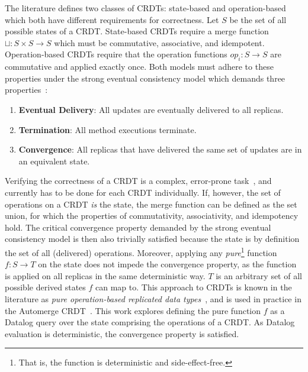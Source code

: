 The literature defines two classes of \acp{CRDT}: state-based and operation-based
which both have different requirements for correctness.
Let \( S \) be the set of all possible states of a \ac{CRDT}.
State-based \acp{CRDT} require a merge function \( \sqcup: S \times S \to S \)
which must be commutative, associative, and idempotent.
Operation-based \acp{CRDT} require that the operation functions \( op_i: S \to S \)
are commutative and applied exactly once.
Both models must adhere to these properties under the strong eventual consistency
model which demands three properties~\cite{shapiro2011comprehensive}:

\begin{enumerate}
	\item \textbf{Eventual Delivery}: All updates are eventually delivered to
	      all replicas.
	\item \textbf{Termination}: All method executions terminate.
	\item \textbf{Convergence}: All replicas that have delivered the same set of
	      updates are in an equivalent state.
\end{enumerate}

Verifying the correctness of a \ac{CRDT} is a complex,
error-prone task~\cite{gomes2017verifying, kleppmann2022assessing},
and currently has to be done for each \ac{CRDT} individually.
If, however, the set of operations on a \ac{CRDT} \emph{is} the state,
the merge function can be defined as the set union,
for which the properties of commutativity, associativity, and idempotency hold.
The critical convergence property demanded by the strong eventual consistency
model is then also trivially satisfied because the state is by definition
the set of all (delivered) operations.
Moreover, applying any \emph{pure}\footnote{
	That is, the function is deterministic and side-effect-free.
}
function \( f: S \to T \) on the state does not impede the convergence property,
as the function is applied on all replicas in the same deterministic way.
\( T \) is an arbitrary set of all possible derived states \( f \) can map to.
This approach to \acp{CRDT} is known in the literature as
\emph{pure operation-based replicated data types}~\cite{baquero2017pure, stewen2024undo},
and is used in practice in the Automerge \ac{CRDT}~\cite{automerge}.
This work explores defining the pure function \( f \) as a Datalog query
over the state comprising the operations of a \ac{CRDT}.
As Datalog evaluation is deterministic, the convergence property is satisfied.



